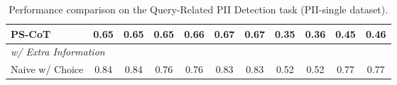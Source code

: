 \begin{table*}[htp]
{\begin{tabular}{lcccccccccc}
\multicolumn{1}{l}{PS-CoT} & 0.65 & \multicolumn{1}{c}{0.65} & 0.65 & \multicolumn{1}{c}{0.66} & 0.67 & \multicolumn{1}{c}{0.67} & 0.35 & \multicolumn{1}{c}{0.36} & \textbf{0.45} & 0.46 \\ \hline
\multicolumn{11}{l}{\cellcolor[HTML]{EFEFEF}\textit{w/ Extra Information}} \\ \hline
\multicolumn{1}{l}{Naive w/ Choice} & 0.84 & \multicolumn{1}{c}{0.84} & 0.76 & \multicolumn{1}{c}{0.76} & 0.83 & \multicolumn{1}{c}{0.83} & 0.52 & \multicolumn{1}{c}{0.52} & 0.77 & 0.77 \\ \bottomrule
\end{tabular}}
\caption{Performance comparison on the Query-Related PII Detection task (PII-single dataset).}
\label{tab:single}
\end{table*}

